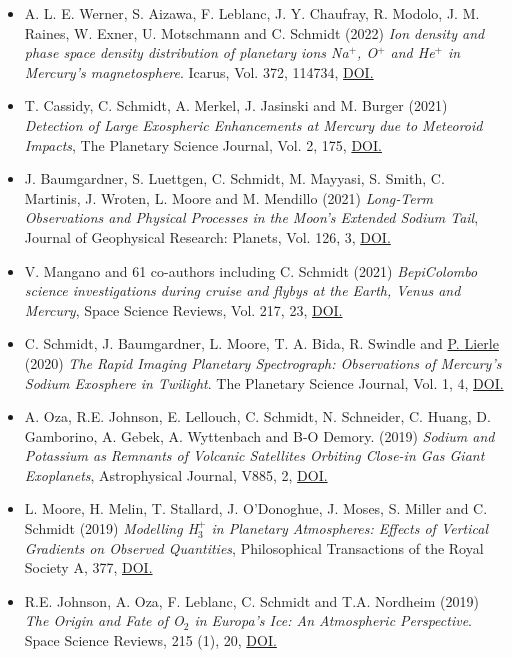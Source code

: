 \documentclass[12pt]{report}
\begin{document}
\begin{itemize} \itemsep -2pt %
  \item A. L. E. Werner, S. Aizawa, F. Leblanc, J. Y. Chaufray, R. Modolo, J. M. Raines, W. Exner, U. Motschmann and C. Schmidt (2022) \textit{ Ion density and phase space density distribution of planetary ions Na$^+$, O$^+$ and He$^+$ in Mercury's magnetosphere}. Icarus, Vol. 372, 114734, \href{https://doi.org/10.1016/j.icarus.2021.114734}{DOI.}
  \item  T. Cassidy, C. Schmidt, A. Merkel, J. Jasinski and M. Burger (2021) \textit{Detection of Large Exospheric Enhancements at Mercury due to Meteoroid Impacts}, The Planetary Science Journal, Vol. 2, 175, \href{https://doi.org/10.3847/PSJ/ac1a19}{DOI.}
  \item J. Baumgardner, S. Luettgen, C. Schmidt, M. Mayyasi, S. Smith, C. Martinis, J. Wroten, L. Moore and M. Mendillo (2021) \textit{Long‐Term Observations and Physical Processes in the Moon’s Extended Sodium Tail}, Journal of Geophysical Research: Planets, Vol. 126, 3, \href{https://doi.org/10.1029/2020JE006671}{DOI.}
  \item V. Mangano and 61 co-authors including C. Schmidt (2021) \textit{BepiColombo science investigations during cruise and flybys at the Earth, Venus and Mercury}, Space Science Reviews, Vol. 217, 23, \href{https://doi.org/10.1007/s11214-021-00797-9}{DOI.} 
  \item C. Schmidt, J. Baumgardner, L. Moore, T. A. Bida, R. Swindle and \underline{P. Lierle} (2020) \textit{The Rapid Imaging Planetary Spectrograph: Observations of Mercury's Sodium Exosphere in Twilight}. The Planetary Science Journal, Vol. 1, 4, \href{https://doi.org/10.3847/PSJ/ab76c9}{DOI.}
  \item A. Oza, R.E. Johnson, E. Lellouch, C. Schmidt, N. Schneider, C. Huang, D. Gamborino, A. Gebek, A. Wyttenbach and B-O Demory. (2019) \textit{Sodium and Potassium as Remnants of Volcanic Satellites Orbiting Close-in Gas Giant Exoplanets}, Astrophysical Journal, V885, 2, \href{https://doi.org/10.3847/1538-4357/ab40cc}{DOI.}
  \item L. Moore, H. Melin, T. Stallard, J. O'Donoghue, J. Moses, S. Miller and C. Schmidt (2019) \textit{Modelling H$_3^+$ in Planetary Atmospheres: Effects of Vertical Gradients on Observed Quantities}, Philosophical Transactions of the Royal Society A, 377, \href{https://doi.org/10.1098/rsta.2019.0067}{DOI.}
  \item R.E. Johnson, A. Oza, F. Leblanc,  C. Schmidt and T.A. Nordheim (2019) \textit{The Origin and Fate of O$_2$ in Europa's Ice: An Atmospheric Perspective}. Space Science Reviews, 215 (1), 20, \href{https://doi.org/10.1007/s11214-019-0582-1}{DOI.}

\end{itemize}
\end{document}

